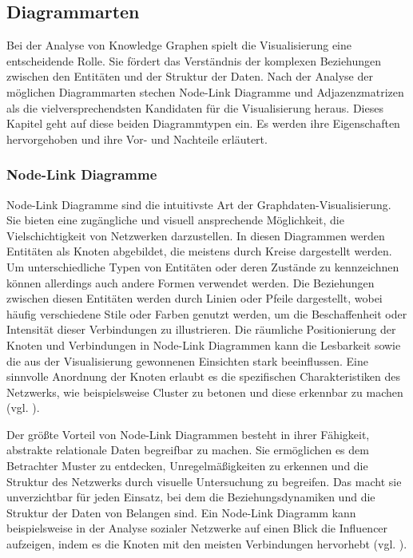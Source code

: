 \subsection{Diagrammarten}
\label{theory:visualization:types}

Bei der Analyse von Knowledge Graphen spielt die Visualisierung eine entscheidende Rolle. Sie fördert das Verständnis der komplexen Beziehungen zwischen den Entitäten und der Struktur der Daten. Nach der Analyse der möglichen Diagrammarten stechen Node-Link Diagramme und Adjazenzmatrizen als die vielversprechendsten Kandidaten für die Visualisierung heraus. Dieses Kapitel geht auf diese beiden  Diagrammtypen ein. Es werden ihre Eigenschaften hervorgehoben und ihre Vor- und Nachteile erläutert.

\subsubsection{Node-Link Diagramme}

Node-Link Diagramme sind die intuitivste Art der Graphdaten-Visualisierung. Sie bieten eine zugängliche und visuell  ansprechende Möglichkeit, die Vielschichtigkeit von Netzwerken darzustellen. In diesen Diagrammen werden Entitäten als Knoten abgebildet, die meistens durch Kreise dargestellt werden. Um unterschiedliche Typen von Entitäten oder deren Zustände zu kennzeichnen können allerdings auch andere Formen verwendet werden. Die Beziehungen zwischen diesen Entitäten werden durch Linien oder Pfeile dargestellt, wobei häufig verschiedene Stile oder Farben genutzt werden, um die Beschaffenheit oder Intensität dieser Verbindungen zu illustrieren. Die räumliche Positionierung der Knoten und Verbindungen in Node-Link Diagrammen kann die Lesbarkeit sowie die aus der Visualisierung gewonnenen Einsichten stark beeinflussen. Eine sinnvolle Anordnung der Knoten erlaubt es die spezifischen Charakteristiken des Netzwerks, wie beispielsweise Cluster zu betonen und diese erkennbar zu machen (vgl. \cite{nodelink:Basics}).

Der größte Vorteil von Node-Link Diagrammen besteht in ihrer Fähigkeit, abstrakte relationale Daten begreifbar zu machen. Sie ermöglichen es dem Betrachter Muster zu entdecken, Unregelmäßigkeiten zu erkennen und die Struktur des Netzwerks durch visuelle Untersuchung zu begreifen. Das macht sie unverzichtbar für jeden Einsatz, bei dem die Beziehungsdynamiken und die Struktur der Daten von Belangen sind. Ein Node-Link Diagramm kann beispielsweise in der Analyse sozialer Netzwerke auf einen Blick die Influencer aufzeigen, indem es die Knoten mit den meisten Verbindungen hervorhebt (vgl. \cite{nodelink:Basics}).

